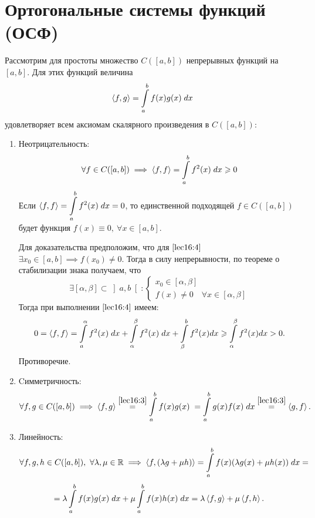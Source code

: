 \documentclass[../../main.tex]{subfiles}
\begin{document}
	 \section{Ортогональные системы функций (ОСФ)}
	 Рассмотрим для простоты множество $C(\left[a, b\right])$ непрерывных функций 
	 на $\left[a, b\right]$. Для этих функций величина
	   \begin{equation}
	 \label{lec16:3}
	 	 \left\langle f, g \right\rangle = \int \limits_a^b f(x)g(x)\; dx
	  \end{equation}
	  удовлетворяет всем аксиомам скалярного произведения в $C(\left[a, 
	  b\right])$:
	 \begin{enumerate}
	 \item Неотрицательность:
	 \begin{equation}
	 \label{lec16:4}
	 \forall f \in C(\left[a, b\right]) \implies \left\langle f, f \right\rangle = 
	 \int\limits_a^bf^2(x)\; 
	 dx \geqslant 0 
	 \end{equation}
	 Если
	 $\displaystyle \left\langle f, f \right\rangle = \int\limits_a^bf^2(x)\; dx = 0 $, то 
	 единственной  подходящей $f \in 
	 C(\left[a,
	  b\right]) $ будет функция $f(x) \equiv 0, \ \forall x \in \left[a, 
	  b\right]$.
	  
	 Для доказательства предположим, что для $\eqref{lec16:4}$ 
	 $\exists
	  x_0 \in \left[a, b\right] \implies f(x_0) \neq 0$. Тогда в силу 
	  непрерывности,
	   по теореме о стабилизации знака получаем, что \[\exists \left[\alpha, 
	   \beta 
	   \right]
	    \subset \left]a, b\right[ : \begin{cases}
	 x_0 \in \left[\alpha, \beta \right]\\
	 f(x) \neq 0 \quad \forall x \in \left[\alpha, \beta \right] 
	 \end{cases}\]
	 Тогда при выполнении $\eqref{lec16:4}$ имеем:
	 \[0 = \left\langle f, f \right\rangle = \int\limits_a^\alpha
	  f^2(x)\; dx + \int\limits_\alpha^\beta f^2(x) \; dx + \int\limits_\beta^b 
	  f^2(x)dx \geqslant \int\limits_\alpha^\beta f^2(x)dx  > 0.\]
	  Противоречие.
	 \item Cимметричность:
	 \[\forall f, g \in C(\left[a, b\right]) \implies \left\langle f, g \right\rangle
	  \stackrel{\eqref{lec16:3}}{=} \int\limits_a^b f(x)g(x)\; = \int\limits_a^b 
	  g(x)f(x)\; dx \stackrel{\eqref{lec16:3}}{=} \left\langle g, f \right\rangle.\]
	 \item Линейность:
	 \[\forall f, g, h \in C(\left[a, b\right]),\ \forall \lambda, \mu \in \mathbb{R} 
	 \implies
	  \left\langle f, (\lambda g + \mu h) \right\rangle = \int \limits_a^bf(x) (\lambda g(x) + \mu 
	  h(x)) 
	  \; dx =\] \[=
	   \lambda \int \limits_a^bf(x)g(x)\; dx + \mu \int \limits_a^bf(x)h(x)\; dx 
	   = \lambda\left\langle f, g \right\rangle + \mu\left\langle f, h \right\rangle.\]
\end{enumerate}
\end{document}
